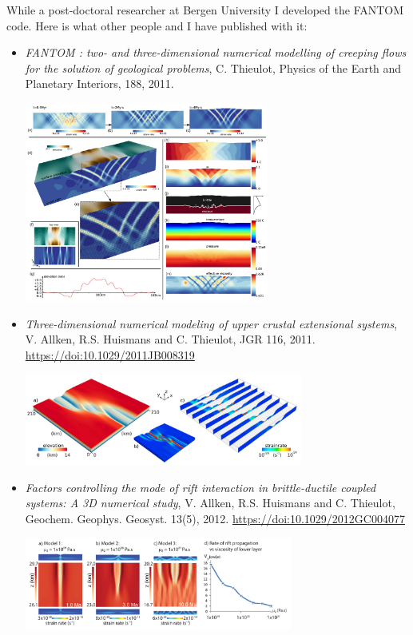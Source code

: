 While a post-doctoral researcher at Bergen University I developed the FANTOM code. Here is what other people and I have published with it:

\begin{itemize}

\item {\it FANTOM : two- and three-dimensional numerical modelling of creeping flows for the solution of geological problems}, 
C. Thieulot, Physics of the Earth and Planetary Interiors, 188, 2011.

\begin{center}
\includegraphics[width=8cm]{images/mycodes/thie11_img}
\end{center}


\item {\it Three-dimensional numerical modeling of upper crustal extensional systems}, 
V. Allken, R.S. Huismans and C. Thieulot, JGR 116, 2011. \url{https://doi:10.1029/2011JB008319} 

\begin{center}
\includegraphics[height=3cm]{images/mycodes/alht11_img}
\end{center}


\item {\it Factors controlling the mode of rift interaction in brittle-ductile coupled systems: A 3D numerical study}, 
V. Allken, R.S. Huismans and C. Thieulot, Geochem. Geophys. Geosyst. 13(5), 2012.
\url{https://doi:10.1029/2012GC004077}

\begin{center}
\includegraphics[height=3cm]{images/mycodes/alht12_img}
\end{center}



\end{itemize}
